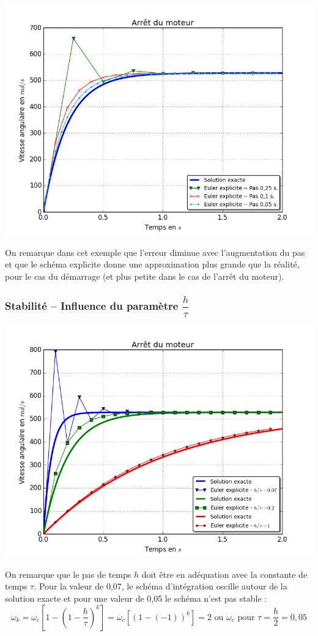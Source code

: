 \documentclass[10pt]{article}
\begin{document}
\begin{center}
\includegraphics[width=.8\textwidth]{images/fig_07_bis}
\end{center}

On remarque dans cet exemple que l’erreur diminue avec l’augmentation du pas et que le schéma explicite donne une approximation plus grande que la réalité, pour le cas du démarrage (et plus petite dans le cas de l’arrêt du moteur).


\subsubsection{Stabilité -- Influence du paramètre $\dfrac{h}{\tau}$}

\begin{center}
\includegraphics[width=.8\textwidth]{images/fig_08_bis}
\end{center}

On remarque que le pas de temps $h$ doit être en adéquation avec la constante de temps $\tau$. Pour la valeur de 0,07, le schéma d’intégration oscille autour de la solution exacte et pour une valeur de 0,05 le schéma n’est pas stable :
$$\omega_k=\omega_c\left[1-(1-\dfrac{h}{\tau})^k \right]=\omega_c[(1-(-1))^k ]=2\text{ ou }\omega_c \text{ pour } \tau=\dfrac{h}{2}=0,05 $$
\end{document}
